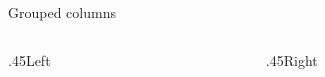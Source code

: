 \documentclass{beamer}
\date{}
\begin{document}
\begin{frame}[t]{Grouped columns}
{\small
\begin{columns}[onlytextwidth,T]
\begin{column}{.45\textwidth}Left\end{column}
\begin{column}{.45\textwidth}Right\end{column}
\end{columns}
\par}
\end{frame}
\end{document}
